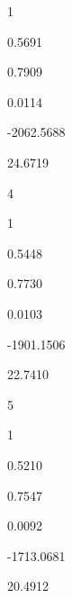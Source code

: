 \documentclass[a4paper,portrait,12pt]{article}
\begin{document}
1





0.5691





0.7909





0.0114





-2062.5688





24.6719





4





1





0.5448





0.7730





0.0103





-1901.1506





22.7410





5





1





0.5210





0.7547





0.0092





-1713.0681





20.4912
\end{document}
